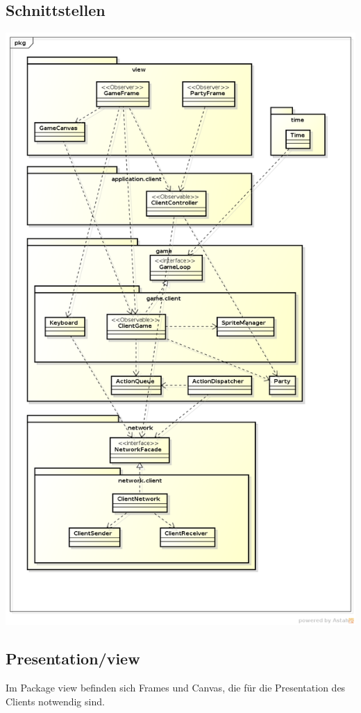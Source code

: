 \documentclass[11pt]{scrartcl}
\begin{document}
\subsection{Schnittstellen}
\includegraphics[scale=0.4]{LogischeSichtClient}
\newpage

\subsection{Presentation/view}
Im Package view befinden sich Frames und Canvas, die für die Presentation des Clients notwendig sind.
\end{document}
